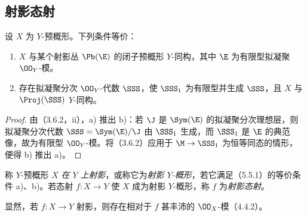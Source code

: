 \subsection{射影态射}

设 $X$ 为 $Y$-预概形。下列条件等价：
\begin{enumerate}[label=\alph*)]
\item $X$ 与某个射影丛 $\Pb(\E)$ 的闭子预概形 $Y$-同构，其中 $\E$ 为有限型拟凝聚 $\OO_Y$-模。
\item 存在拟凝聚分次 $\OO_Y$-代数 $\SSS$，使 $\SSS_1$ 为有限型并生成 $\SSS$，且 $X$ 与 $\Proj(\SSS)$ $Y$-同构。
\end{enumerate}
\begin{proof}
由（3.6.2，ii），a) 推出 b)：若 $\J$ 是 $\Sym(\E)$ 的拟凝聚分次理想层，则拟凝聚分次代数
$\SSS=\Sym(\E)/\J$ 由 $\SSS_1$ 生成，而 $\SSS_1$ 是 $\E$ 的典范像，故为有限型 $\OO_Y$-模。将（3.6.2）应用于 $\M\to\SSS_1$ 为恒等同态的情形，便得 b) 推出 a)。
\end{proof}

称 $Y$-预概形 $X$ \emph{在 $Y$ 上射影}，或称它为\emph{射影 $Y$-概形}，若它满足（5.5.1）的等价条件 a)、b)。若态射 $f:X\to Y$ 使 $X$ 成为射影 $Y$-概形，称 $f$ 为\emph{射影态射}。

显然，若 $f:X\to Y$ 射影，则存在相对于 $f$ 甚丰沛的 $\OO_X$-模（4.4.2）。


